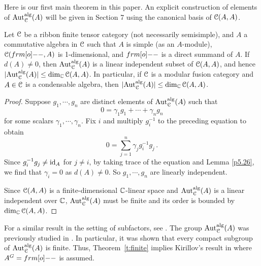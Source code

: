 \documentclass{amsart}
\begin{document}
Here is our first main theorem in this paper. An explicit construction of elements 
of ${\operatorname{Aut}_{\EuScript{C}}^{\operatorname{alg}}}(A)$ will be given in Section 7 using the canonical basis of ${\EuScript{C}}(A,A)$.

\begin{thm} \label{t:finite}
  Let ${\EuScript{C}}$ be a ribbon finite tensor category (not necessarily semisimple), and $A$ a commutative algebra in ${\EuScript{C}}$ such that $A$ is simple (as an $A$-module), $\CC(\1, A)$ is 1-dimensional, and $\1$ is a direct summand of $A$. If $d(A) \ne 0$, then ${\operatorname{Aut}_{\EuScript{C}}^{\operatorname{alg}}}(A)$ is a linear independent subset of ${\EuScript{C}}(A,A)$, and hence $|{\operatorname{Aut}_{\EuScript{C}}^{\operatorname{alg}}}(A)| \le \dim_{\mathbb{C}} {\EuScript{C}}(A,A)$. In particular, if ${\EuScript{C}}$ is a modular fusion category and $A \in {\EuScript{C}}$ is a condensable algebra, then $|{\operatorname{Aut}_{\EuScript{C}}^{\operatorname{alg}}}(A)| \le \dim_{\mathbb{C}} {\EuScript{C}}(A,A)$.
\end{thm}
\begin{proof}
Suppose $g_1, \cdots, g_n$ are distinct elements of ${\operatorname{Aut}_{\EuScript{C}}^{\operatorname{alg}}}(A)$ such that 
$$
0 = \gamma_1 g_1 + \cdots + \gamma_n g_n
$$
for some  scalars $\gamma_1, \cdots, \gamma_n$. Fix $i$ and  multiply $g_i^{-1}$ to the preceding equation to obtain 
$$
0 = \sum_{j=1}^n\gamma_jg_i^{-1}g_j\,.
$$
Since $g_i^{-1} g_j \ne \operatorname{id}_A$ for $j\ne i$, by taking trace of the equation and Lemma \ref{p5.26}, we find that $\gamma_i=0 $ as $d(A)\ne 0.$ So $g_1, \cdots, g_n$  are linearly independent.

Since ${\EuScript{C}}(A,A)$ is a finite-dimensional $\mathbb{C}$-linear space and ${\operatorname{Aut}_{\EuScript{C}}^{\operatorname{alg}}}(A)$ is a linear independent over $\mathbb{C}$,  ${\operatorname{Aut}_{\EuScript{C}}^{\operatorname{alg}}}(A)$ must be finite and its order is bounded by $\dim_{\mathbb{C}} {\EuScript{C}}(A,A)$. 
\end{proof}
For a similar result in the setting of subfactors, see  \cite[Lem. 2.8]{Xu2010}. 
The group ${\operatorname{Aut}_{\EuScript{C}}^{\operatorname{alg}}}(A)$ was previously studied in \cite{Ki2002}. In particular, it was shown that every compact subgroup of ${\operatorname{Aut}_{\EuScript{C}}^{\operatorname{alg}}}(A)$ is finite. Thus, Theorem~\ref{t:finite} implies Kirillov's result in \cite{Ki2002} where  $A^G = \1$ is assumed.
\end{document}
